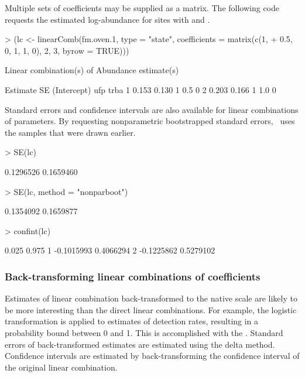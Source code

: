 \documentclass[article,shortnames]{jss}
\newcommand{\um}{\pkg{unmarked}}
\begin{document}
Multiple sets of coefficients may be supplied as a matrix.  The
following code requests the estimated log-abundance for sites with
 and .

\begin{Schunk}
\begin{Sinput}
> (lc <- linearComb(fm.oven.1, type = "state", coefficients = matrix(c(1, 
+     0.5, 0, 1, 1, 0), 2, 3, byrow = TRUE)))
\end{Sinput}
\begin{Soutput}
Linear combination(s) of Abundance estimate(s)

  Estimate    SE (Intercept) ufp trba
1    0.153 0.130           1 0.5    0
2    0.203 0.166           1 1.0    0
\end{Soutput}
\end{Schunk}

Standard errors and confidence intervals are also available for linear
combinations of parameters.  By requesting nonparametric bootstrapped
standard errors, \um\ uses the samples that were drawn earlier.

\begin{Schunk}
\begin{Sinput}
> SE(lc)
\end{Sinput}
\begin{Soutput}
[1] 0.1296526 0.1659460
\end{Soutput}
\begin{Sinput}
> SE(lc, method = "nonparboot")
\end{Sinput}
\begin{Soutput}
[1] 0.1354092 0.1659877
\end{Soutput}
\begin{Sinput}
> confint(lc)
\end{Sinput}
\begin{Soutput}
       0.025     0.975
1 -0.1015993 0.4066294
2 -0.1225862 0.5279102
\end{Soutput}
\end{Schunk}

\subsubsection{Back-transforming linear combinations of coefficients}

Estimates of linear combination back-transformed to the native scale
are likely to be more interesting than the direct linear combinations.
For example, the logistic transformation is applied to estimates of
detection rates, resulting in a probability bound between 0 and
1. This is accomplished with the .  Standard
errors of back-transformed estimates are estimated using the delta
method.  Confidence intervals are estimated by back-transforming the
confidence interval of the original linear combination.
\end{document}
